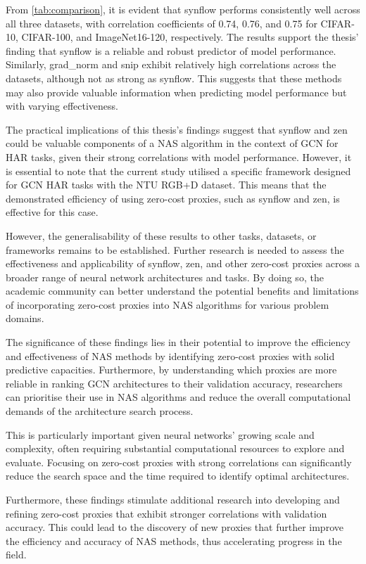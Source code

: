From \cref{tab:comparison}, it is evident that synflow performs consistently well across all three datasets, with correlation coefficients of 0.74, 0.76, and 0.75 for CIFAR-10, CIFAR-100, and ImageNet16-120, respectively. The results support the thesis' finding that synflow is a reliable and robust predictor of model performance. Similarly, grad\_norm and snip exhibit relatively high correlations across the datasets, although not as strong as synflow. This suggests that these methods may also provide valuable information when predicting model performance but with varying effectiveness.

The practical implications of this thesis's findings suggest that synflow and zen could be valuable components of a NAS algorithm in the context of GCN for HAR tasks, given their strong correlations with model performance. However, it is essential to note that the current study utilised a specific framework designed for GCN HAR tasks with the NTU RGB+D dataset. This means that the demonstrated efficiency of using zero-cost proxies, such as synflow and zen, is effective for this case.

However, the generalisability of these results to other tasks, datasets, or frameworks remains to be established. Further research is needed to assess the effectiveness and applicability of synflow, zen, and other zero-cost proxies across a broader range of neural network architectures and tasks. By doing so, the academic community can better understand the potential benefits and limitations of incorporating zero-cost proxies into NAS algorithms for various problem domains.  

The significance of these findings lies in their potential to improve the efficiency and effectiveness of NAS methods by identifying zero-cost proxies with solid predictive capacities. Furthermore, by understanding which proxies are more reliable in ranking GCN architectures to their validation accuracy, researchers can prioritise their use in NAS algorithms and reduce the overall computational demands of the architecture search process.

This is particularly important given neural networks' growing scale and complexity, often requiring substantial computational resources to explore and evaluate. Focusing on zero-cost proxies with strong correlations can significantly reduce the search space and the time required to identify optimal architectures.

Furthermore, these findings stimulate additional research into developing and refining zero-cost proxies that exhibit stronger correlations with validation accuracy. This could lead to the discovery of new proxies that further improve the efficiency and accuracy of NAS methods, thus accelerating progress in the field.

